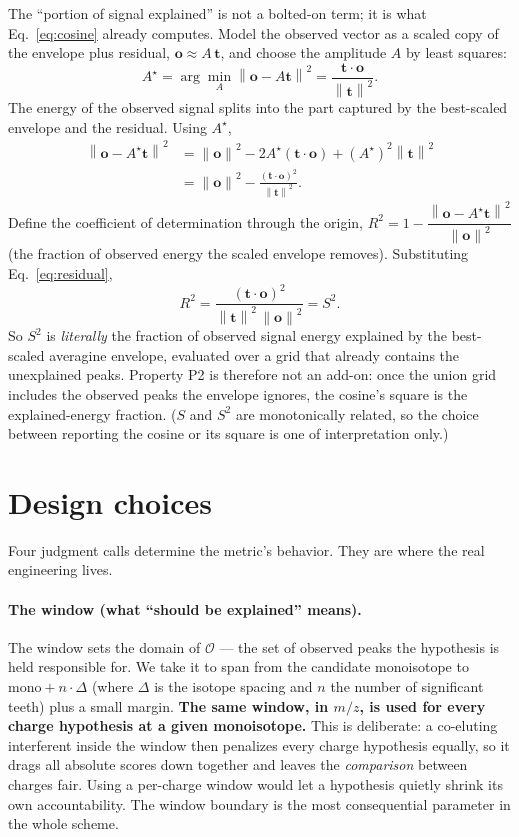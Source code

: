 \documentclass[11pt]{article}
\newcommand{\tvec}{\mathbf{t}}
\newcommand{\ovec}{\mathbf{o}}
\newcommand{\norm}[1]{\left\lVert #1 \right\rVert}
\begin{document}
The ``portion of signal explained'' is not a bolted-on term; it is what
Eq.~\eqref{eq:cosine} already computes. Model the observed vector as a scaled copy of
the envelope plus residual, $\ovec \approx A\,\tvec$, and choose the amplitude $A$ by
least squares:
\begin{equation}
A^\star = \arg\min_A \norm{\ovec - A\tvec}^2
        = \frac{\tvec\cdot\ovec}{\norm{\tvec}^2}.
\label{eq:amp}
\end{equation}
The energy of the observed signal splits into the part captured by the best-scaled
envelope and the residual. Using $A^\star$,
\begin{align}
\norm{\ovec - A^\star \tvec}^2
  &= \norm{\ovec}^2 - 2A^\star (\tvec\cdot\ovec) + (A^\star)^2\norm{\tvec}^2 \nonumber\\
  &= \norm{\ovec}^2 - \frac{(\tvec\cdot\ovec)^2}{\norm{\tvec}^2}.
\label{eq:residual}
\end{align}
Define the coefficient of determination through the origin,
$R^2 = 1 - \dfrac{\norm{\ovec - A^\star\tvec}^2}{\norm{\ovec}^2}$
(the fraction of observed energy the scaled envelope removes). Substituting
Eq.~\eqref{eq:residual},
\begin{equation}
R^2 = \frac{(\tvec\cdot\ovec)^2}{\norm{\tvec}^2\,\norm{\ovec}^2} = S^2 .
\label{eq:r2}
\end{equation}
So $S^2$ is \emph{literally} the fraction of observed signal energy explained by the
best-scaled averagine envelope, evaluated over a grid that already contains the
unexplained peaks. Property P2 is therefore not an add-on: once the union grid
includes the observed peaks the envelope ignores, the cosine's square is the
explained-energy fraction. ($S$ and $S^2$ are monotonically related, so the choice
between reporting the cosine or its square is one of interpretation only.)

\section{Design choices}
\label{sec:design}

Four judgment calls determine the metric's behavior. They are where the real
engineering lives.

\paragraph{The window (what ``should be explained'' means).}
The window sets the domain of $\mathcal{O}$ --- the set of observed peaks the
hypothesis is held responsible for. We take it to span from the candidate
monoisotope to $\text{mono} + n\cdot\Delta$ (where $\Delta$ is the isotope spacing
and $n$ the number of significant teeth) plus a small margin. \textbf{The same
window, in $m/z$, is used for every charge hypothesis at a given monoisotope.} This
is deliberate: a co-eluting interferent inside the window then penalizes every charge
hypothesis equally, so it drags all absolute scores down together and leaves the
\emph{comparison} between charges fair. Using a per-charge window would let a
hypothesis quietly shrink its own accountability. The window boundary is the most
consequential parameter in the whole scheme.
\end{document}
